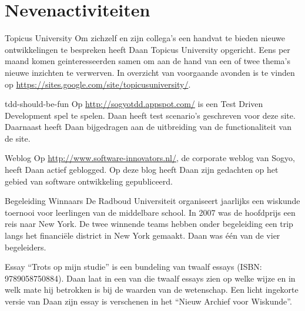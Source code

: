 \section*{Nevenactiviteiten}

	\begin{subActivityList}
		\item[Topicus University] Om zichzelf en zijn collega's een handvat te
		bieden nieuwe ontwikkelingen te bespreken heeft Daan Topicus University
		opgericht. Eens per maand komen geinteresseerden samen om aan de hand
		van een of twee thema's nieuwe inzichten te verwerven. In overzicht
		van voorgaande avonden is te vinden op
		\url{https://sites.google.com/site/topicusuniversity/}.
	
		\item[tdd-should-be-fun] Op \url{http://sogyotdd.appspot.com/} is een
		Test Driven Development spel te spelen. Daan heeft test scenario's
		geschreven voor deze site. Daarnaast heeft Daan bijgedragen aan de
		uitbreiding van de functionaliteit van de site.\hfill\\
	
		\item[Weblog] Op \url{http://www.software-innovators.nl/}, de corporate
		weblog van Sogyo, heeft Daan actief geblogged. Op deze blog heeft
		Daan zijn gedachten op het gebied van software ontwikkeling gepubliceerd.
		\hfill\\
		
		\item[Begeleiding Winnaars] De Radboud Universiteit organiseert
		jaarlijks een wiskunde toernooi voor leerlingen van de middelbare
		school. In 2007 was de hoofdprijs een reis naar New York. De twee
		winnende teams hebben onder begeleiding een trip langs het financi\"ele
		district in New York gemaakt. Daan was \'e\'en van de vier begeleiders.
		\hfill\\
		
		\item[Essay] ``Trots op mijn studie'' is een bundeling van twaalf essays
		(ISBN: 9789058750884). Daan laat in een van die twaalf essays zien op
		welke wijze en in welk mate hij betrokken is bij de waarden van de
		wetenschap.
		Een licht ingekorte versie van Daan zijn essay is verschenen in het
		``Nieuw Archief voor Wiskunde''.		
		\hfill\\
	\end{subActivityList}

